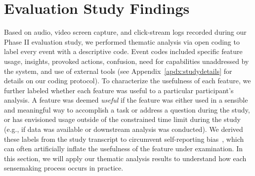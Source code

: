  \section{Evaluation Study Findings\label{sec:eval_findings}}
 Based on audio, video screen capture,
 and click-stream logs recorded
 during our Phase II evaluation study,
 we performed thematic analysis via open coding to label every event with a descriptive code. Event codes included specific feature usage,
 insights,
 provoked actions, confusion,
 need for capabilities unaddressed
 by the system, and use of external tools (see Appendix~\ref{apdx:studydetails} for details on our coding protocol). To characterize the usefulness
 of each feature, we further labeled whether each
 feature was useful to a particular participant's analysis.
 A feature was deemed \textit{useful}
 if the feature was either used in a sensible
 and meaningful way to accomplish a task or address a question during the study,
 or has envisioned usage outside of the constrained
 time limit during the study
 (e.g., if data was available or downstream analysis was conducted).
 We derived these labels from the study transcript
 to circumvent self-reporting bias~\cite{Williams2017},
 which can often artificially inflate
 the usefulness of the feature under examination.
 In this section, we will apply our thematic analysis results to understand how each sensemaking process occurs in practice.%
